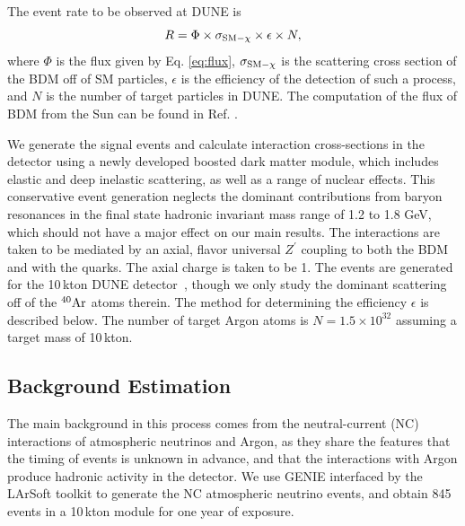 The event rate to be observed at DUNE is 
\begin{equation}
R = \Phi \times \sigma_{\rm{SM} - \chi} \times \epsilon \times N,
\end{equation}
 where $\Phi$ is the flux given by Eq. \ref{eq:flux}, $\sigma_{\rm{SM} - \chi}$ is the scattering cross section of the BDM off of SM particles, $\epsilon$ is the efficiency of the detection of such a process, and $N$ is the number of target particles in DUNE. The computation of the flux of BDM from the Sun can be found in Ref. \cite{Berger:2014sqa}. 
 
We generate the signal events and calculate interaction cross-sections in the detector using a newly developed boosted dark matter module\cite{Andreopoulos:2009rq,Andreopoulos:2015wxa,Berger:2018}, which includes elastic and deep inelastic scattering, as well as a range of nuclear effects. This conservative event generation neglects the dominant contributions from baryon resonances in the final state hadronic invariant mass range of 1.2 to 1.8 GeV, which should not have a major effect on our main results. The interactions are taken to be mediated by an axial, flavor universal $Z^\prime$ coupling to both the BDM and with the quarks. The axial charge is taken to be 1. 
The events are generated for the 10\,kton DUNE detector~\cite{dunetpc_code}, though we only study the dominant scattering off of the ${}^{40}{\rm Ar}$ atoms therein. The method for determining the efficiency $\epsilon$ is described below. The number of target Argon atoms is $N = 1.5  \times 10^{32}$ assuming a target mass of 10\,kton.

\subsection{Background Estimation}
\label{sec:background}

The main background in this process comes from the neutral-current (NC) 
interactions of atmospheric neutrinos and Argon,
as they share the features that the timing of events is unknown in advance,
and that the interactions with Argon produce hadronic activity in the detector.
We use GENIE\cite{Andreopoulos:2009rq,Andreopoulos:2015wxa}
interfaced by the LArSoft toolkit to generate the NC atmospheric
neutrino events, and obtain 845 events in a 10\,kton module for one year of
exposure.

